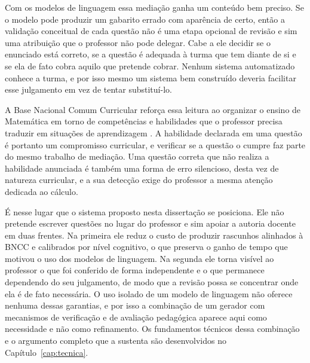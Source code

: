Com os modelos de linguagem essa mediação ganha um conteúdo bem preciso. Se o modelo pode produzir
um gabarito errado com aparência de certo, então a validação conceitual de cada questão não é uma
etapa opcional de revisão e sim uma atribuição que o professor não pode delegar. Cabe a ele decidir
se o enunciado está correto, se a questão é adequada à turma que tem diante de si e se ela de fato
cobra aquilo que pretende cobrar. Nenhum sistema automatizado conhece a turma, e por isso mesmo um
sistema bem construído deveria facilitar esse julgamento em vez de tentar substituí-lo.

A Base Nacional Comum Curricular reforça essa leitura ao organizar o ensino de Matemática em torno
de competências e habilidades que o professor precisa traduzir em situações de aprendizagem
\citep{brasil2018bncc}. A habilidade declarada em uma questão é portanto um compromisso
curricular, e verificar se a questão o cumpre faz parte do mesmo trabalho de mediação. Uma questão
correta que não realiza a habilidade anunciada é também uma forma de erro silencioso, desta vez de
natureza curricular, e a sua detecção exige do professor a mesma atenção dedicada ao cálculo.

É nesse lugar que o sistema proposto nesta dissertação se posiciona. Ele não pretende escrever
questões no lugar do professor e sim apoiar a autoria docente em duas frentes. Na primeira ele
reduz o custo de produzir rascunhos alinhados à BNCC e calibrados por nível cognitivo, o que
preserva o ganho de tempo que motivou o uso dos modelos de linguagem. Na segunda ele torna
visível ao professor o que foi conferido de forma independente e o que permanece dependendo do seu
julgamento, de modo que a revisão possa se concentrar onde ela é de fato necessária. O uso isolado
de um modelo de linguagem não oferece nenhuma dessas garantias, e por isso a combinação de um
gerador com mecanismos de verificação e de avaliação pedagógica aparece aqui como necessidade e
não como refinamento. Os fundamentos técnicos dessa combinação e o argumento completo que a
sustenta são desenvolvidos no Capítulo~\ref{cap:tecnica}.
